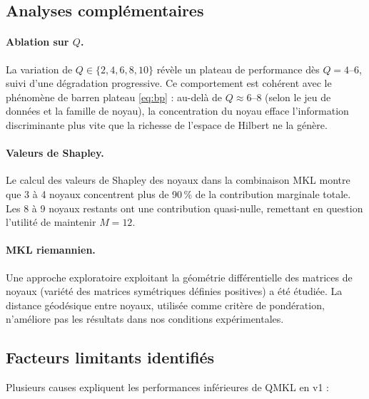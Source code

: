 \documentclass[12pt,a4paper]{article}
\begin{document}
\subsection{Analyses complémentaires}

\paragraph{Ablation sur $Q$.}
La variation de $Q \in \{2, 4, 6, 8, 10\}$ révèle un plateau de performance
dès $Q = 4$--6, suivi d'une dégradation progressive.
Ce comportement est cohérent avec le phénomène de barren plateau \eqref{eq:bp} :
au-delà de $Q \approx 6$--8 (selon le jeu de données et la famille de noyau),
la concentration du noyau efface l'information discriminante plus vite que
la richesse de l'espace de Hilbert ne la génère.

\paragraph{Valeurs de Shapley.}
Le calcul des valeurs de Shapley des noyaux dans la combinaison MKL
\cite{shapley1953} montre que 3 à 4 noyaux concentrent plus de 90\,\% de la
contribution marginale totale.
Les 8 à 9 noyaux restants ont une contribution quasi-nulle, remettant en
question l'utilité de maintenir $M = 12$.

\paragraph{MKL riemannien.}
Une approche exploratoire exploitant la géométrie différentielle des matrices
de noyaux (variété des matrices symétriques définies positives) a été étudiée.
La distance géodésique entre noyaux, utilisée comme critère de pondération,
n'améliore pas les résultats dans nos conditions expérimentales.

\subsection{Facteurs limitants identifiés}

Plusieurs causes expliquent les performances inférieures de QMKL en v1 :
\end{document}
